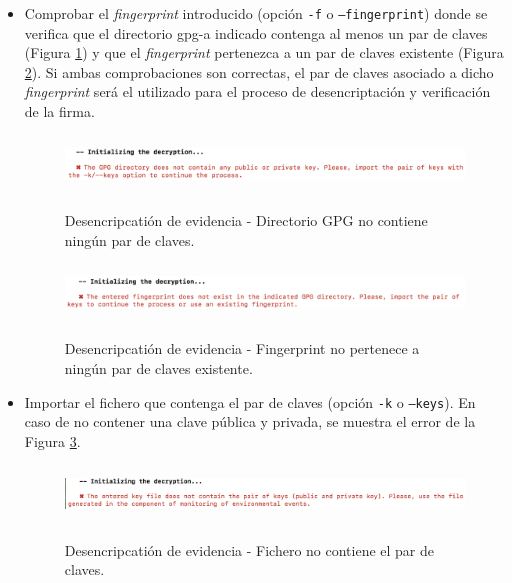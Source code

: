 \documentclass[12pt,a4paper, twoside]{report}
\begin{document}
	\begin{itemize}
		\item Comprobar el \textit{fingerprint} introducido (opción \texttt{-f} o \texttt{--fingerprint}) donde se verifica que el directorio \gls{gpg-a} indicado contenga al menos un par de claves (Figura \ref{fig:userguide_evidence_pairKeys}) y que el \textit{fingerprint} pertenezca a un par de claves existente (Figura \ref{fig:userguide_evidence_fingerprint}). Si ambas comprobaciones son correctas, el par de claves asociado a dicho \textit{fingerprint} será el utilizado para el proceso de desencriptación y verificación de la firma.
		
		\begin{figure}[!ht]   
			\caption{Desencripcatión de evidencia - Directorio GPG no contiene ningún par de claves.} 
			\begin{center} 					\includegraphics[width=16cm,height=1.5cm]{Images/userGuide/evidence/pairKeys} \\
				\label{fig:userguide_evidence_pairKeys} 
			\end{center}  
		\end{figure}
		
		\begin{figure}[!ht]   
			\caption{Desencripcatión de evidencia - Fingerprint no pertenece a ningún par de claves existente.} 
			\begin{center} 					\includegraphics[width=16cm,height=1.5cm]{Images/userGuide/evidence/fingerprint} \\
				\label{fig:userguide_evidence_fingerprint} 
			\end{center}  
		\end{figure}
		
		\newpage
		
		\item Importar el fichero que contenga el par de claves (opción \texttt{-k} o \texttt{--keys}). En caso de no contener una clave pública y privada, se muestra el error de la Figura \ref{fig:userguide_evidence_import}.
		
		\begin{figure}[!ht]   
			\caption{Desencripcatión de evidencia - Fichero no contiene el par de claves.} 
			\begin{center} 					\includegraphics[width=16cm,height=1.5cm]{Images/userGuide/evidence/import} \\
				\label{fig:userguide_evidence_import} 
			\end{center}  
		\end{figure}
		
	\end{itemize}
\end{document}
